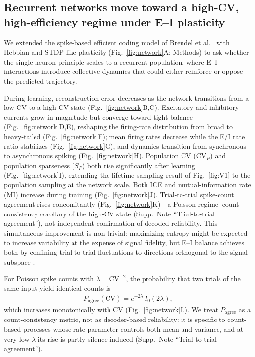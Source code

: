 \subsection{Recurrent networks move toward a high-CV, high-efficiency regime under E--I plasticity}
\label{sec:network_results}

We extended the spike-based efficient coding model of Brendel et al.~\cite{brendel_learning_2020} with Hebbian and STDP-like plasticity \cite{16,sp_stdp,Sp2019} (Fig.~\ref{fig:network}A; Methods) to ask whether the single-neuron principle scales to a recurrent population, where E--I interactions introduce collective dynamics that could either reinforce or oppose the predicted trajectory.

During learning, reconstruction error decreases as the network transitions from a low-CV to a high-CV state (Fig.~\ref{fig:network}B,C).  Excitatory and inhibitory currents grow in magnitude but converge toward tight balance (Fig.~\ref{fig:network}D,E), reshaping the firing-rate distribution from broad to heavy-tailed (Fig.~\ref{fig:network}F); mean firing rates decrease while the E/I rate ratio stabilizes (Fig.~\ref{fig:network}G), and dynamics transition from synchronous to asynchronous spiking (Fig.~\ref{fig:network}H).  Population CV ($\mathrm{CV}_P$) and population sparseness ($S_P$) both rise significantly after learning (Fig.~\ref{fig:network}I), extending the lifetime-sampling result of Fig.~\ref{fig:V1} to the population sampling at the network scale.  Both ICE and mutual-information rate (MI) increase during training (Fig.~\ref{fig:network}J).  Trial-to-trial spike-count agreement rises concomitantly (Fig.~\ref{fig:network}K)---a Poisson-regime, count-consistency corollary of the high-CV state (Supp.~Note ``Trial-to-trial agreement''), not independent confirmation of decoded reliability.  This simultaneous improvement is non-trivial: maximizing entropy might be expected to increase variability at the expense of signal fidelity, but E--I balance achieves both by confining trial-to-trial fluctuations to directions orthogonal to the signal subspace \cite{Renart2010}.

For Poisson spike counts with $\lambda=\mathrm{CV}^{-2}$, the probability that two trials of the same input yield identical counts is
\begin{align}
P_{\mathrm{agree}}(\mathrm{CV}) = e^{-2\lambda}\,I_0(2\lambda),
\end{align}
which increases monotonically with CV (Fig.~\ref{fig:network}L).  We treat $P_{\mathrm{agree}}$ as a count-consistency metric, not as decoder-based reliability: it is specific to count-based processes whose rate parameter controls both mean and variance, and at very low $\lambda$ its rise is partly silence-induced (Supp.~Note ``Trial-to-trial agreement'').

